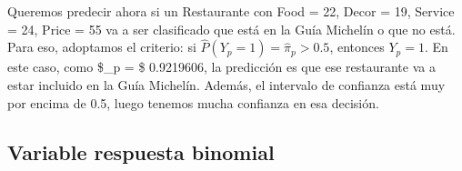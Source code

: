 \documentclass[
]{article}
\begin{document}
Queremos predecir ahora si un Restaurante con Food = 22, Decor = 19,
Service = 24, Price = 55 va a ser clasificado que está en la Guía
Michelín o que no está. Para eso, adoptamos el criterio: si
\(\hat P(Y_p = 1) = \hat \pi_p > 0.5\), entonces \(Y_p = 1\). En este
caso, como \$\hat \pi\_p = \$ 0.9219606, la predicción es que ese
restaurante va a estar incluido en la Guía Michelín. Además, el
intervalo de confianza está muy por encima de 0.5, luego tenemos mucha
confianza en esa decisión.

\hypertarget{variable-respuesta-binomial}{%
\subsection{Variable respuesta
binomial}\label{variable-respuesta-binomial}}
\end{document}

